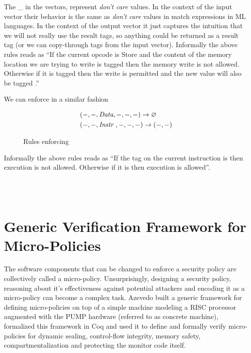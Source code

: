 The \_ in the vectors, represent \textit{don't care} values. In the context of
the input vector their behavior is the same as \textit{don't care} values in
match expressions in ML languages. In the context of the output vector it just
captures the intuition that we will not really use the result tags, so anything
could be returned as a result tag (\IE \DATAname or we can copy-through tags
from the input vector).
Informally the above rules reads as ``If the current opcode is Store and the
content of the memory location we are trying to write is tagged \INSTR{}
then the memory write is not allowed. Otherwise if it is tagged \DATAname then
the write is permitted and the new value will also be tagged \DATA.''

We can enforce \NXD in a similar fashion
\begin{figure}[!htpb]
\begin{align*}
 & (-, -,\textit{Data}, -, -, -) \rightarrow \varnothing \\
 & (-, -,\textit{Instr}~, -, -,-) \rightarrow (-, -)
\end{align*}
\caption{Rules enforcing \NXD}
\end{figure}

Informally the above rules reads as ``If the tag on the current instruction is
\DATAname then execution is not allowed. Otherwise if it is \INSTRname then
execution is allowed''.

\\
\\

\section{Generic Verification Framework for Micro-Policies}\label{sec:micropolicies}

The software components that can be changed to enforce a security policy
are collectively called a micro-policy.
Unsurprisingly, designing a security policy, reasoning about it's effectiveness 
against potential attackers and encoding it as a micro-policy can become a 
complex task. Azevedo \ETAL \cite{pump_popl2015} built a generic framework for
defining micro-policies on top of a simple machine modeling a RISC processor 
augmented with the PUMP hardware (referred to as concrete machine), formalized
this framework in Coq and used it to define and formally verify micro-policies
for dynamic sealing, control-flow integrity, memory safety, compartmentalization
and protecting the monitor code itself.

